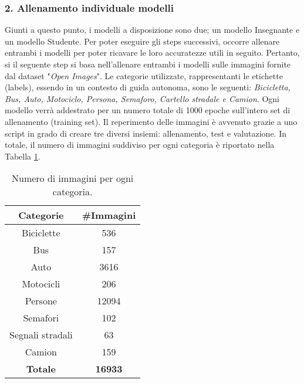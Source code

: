 \subsubsection{2. Allenamento individuale modelli}
Giunti a questo punto, i modelli a disposizione sono due; un modello 
Insegnante e un modello Studente. Per poter eseguire gli steps successivi, 
occorre allenare entrambi i modelli per poter ricavare le loro accuratezze 
utili in seguito. Pertanto, si il seguente step si basa nell'allenare entrambi 
i modelli sulle immagini fornite dal dataset "\emph{Open Images}". Le categorie 
utilizzate, rappresentanti le etichette (labels), essendo in un contesto di 
guida autonoma, sono le seguenti: \emph{Bicicletta, Bus, Auto, Motociclo, Persona, 
Semaforo, Cartello stradale e Camion}. Ogni modello verrà addestrato per 
un numero totale di 1000 epoche sull'intero set di allenamento (training 
set). Il reperimento delle immagini è avvenuto grazie a uno script in grado 
di creare tre diversi insiemi: allenamento, test e valutazione. In totale, il 
numero di immagini suddiviso per ogni categoria è riportato nella Tabella 
\ref{images_train}.
\begin{table}
    \centering
    \begin{adjustbox}{max width=\textwidth}
    \begin{tabular}{|c|c|}
        \hline
        \bfseries{Categorie} & \bfseries{\#Immagini}\\
        \hline
        \hline
        Biciclette & 536 \\
        \hline
        Bus & 157 \\
        \hline
        Auto & 3616 \\
        \hline
        Motocicli & 206\\
        \hline
        Persone & 12094\\
        \hline
        Semafori & 102\\
        \hline
        Segnali stradali & 63\\
        \hline
        Camion & 159\\
        \hline
        \hline
        {\bfseries{Totale}} & {\bfseries{16933}} \\
        \hline
    \end{tabular}
    \end{adjustbox}
    \vspace{0.5cm}
    \caption{Numero di immagini per ogni categoria.}
    \label{images_train}
\end{table}
